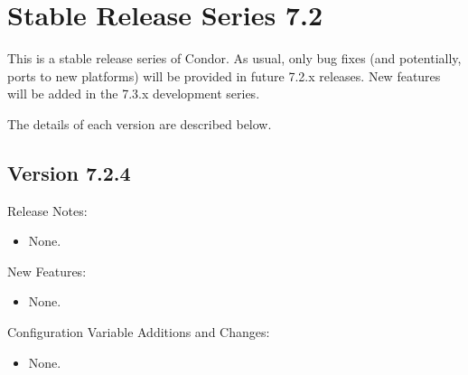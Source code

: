 
\section{\label{sec:History-7-2}Stable Release Series 7.2}

This is a stable release series of Condor.
As usual, only bug fixes (and potentially, ports to new platforms)
will be provided in future 7.2.x releases.
New features will be added in the 7.3.x development series.

The details of each version are described below.

\subsection*{\label{sec:New-7-2-4}Version 7.2.4}

\noindent Release Notes:

\begin{itemize}

\item None.

\end{itemize}


\noindent New Features:

\begin{itemize}

\item None.

\end{itemize}

\noindent Configuration Variable Additions and Changes:

\begin{itemize}

\item None.

\end{itemize}

